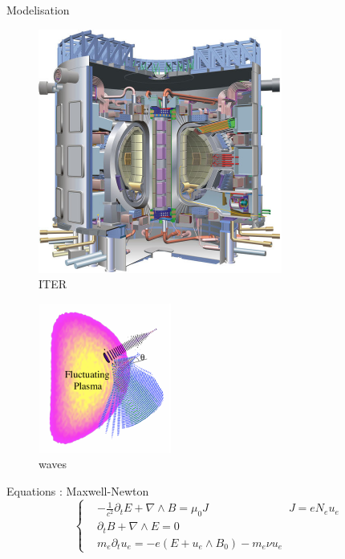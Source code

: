 \begin{frame}{Modelisation}
 \begin{minipage}{0.45\linewidth}
 \begin{figure}
       		\includegraphics[scale = 0.7]{./images/ITER_cut}
       	\caption{ITER}
     	 \end{figure} 
\end{minipage}
\hfill
\begin{minipage}{0.45\linewidth}
 \begin{figure}
       		\includegraphics[scale = 1.2]{./images/antenne}
       		\caption{waves}
     	 \end{figure} 
\end{minipage}
\begin{block}{Equations : Maxwell-Newton}
\[
\begin{cases}
&-\frac{1}{c^2}\partial_t E + \nabla \wedge B = \mu_0 J \hspace{3cm} J = e N_e u_e\\
&\partial_t B + \nabla \wedge E  = 0	\\
&m_e \partial_t u_e  =  -e(E + u_e \wedge B_0 ) - m_e \nu u_e
\end{cases}
\]
\end{block}


\end{frame}
